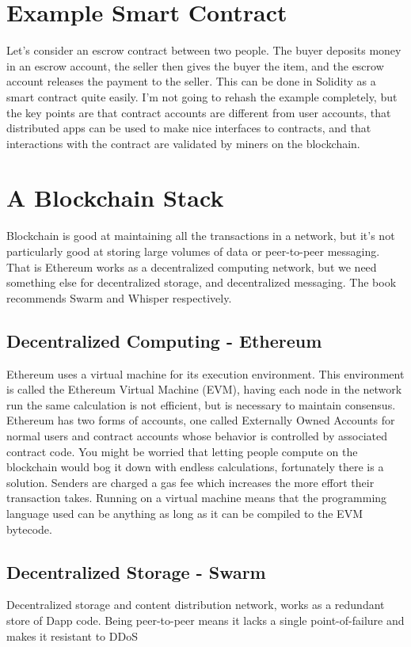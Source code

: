 \documentclass{article}
\begin{document}
\section{Example Smart Contract}

Let's consider an escrow contract between two people. The buyer deposits money in an escrow account, the seller then gives the buyer the item, and the escrow account releases the payment to the seller. This can be done in Solidity as a smart contract quite easily. I'm not going to rehash the example completely, but the key points are that contract accounts are different from user accounts, that distributed apps can be used to make nice interfaces to contracts, and that interactions with the contract are validated by miners on the blockchain.

\section{A Blockchain Stack}

Blockchain is good at maintaining all the transactions in a network, but it's not particularly good at storing large volumes of data or peer-to-peer messaging. That is Ethereum works as a decentralized computing network, but we need something else for decentralized storage, and decentralized messaging. The book recommends Swarm and Whisper respectively.

\subsection{Decentralized Computing - Ethereum}

Ethereum uses a virtual machine for its execution environment. This environment is called the Ethereum Virtual Machine (EVM), having each node in the network run the same calculation is not efficient, but is necessary to maintain consensus. Ethereum has two forms of accounts, one called Externally Owned Accounts for normal users and contract accounts whose behavior is controlled by associated contract code. You might be worried that letting people compute on the blockchain would bog it down with endless calculations, fortunately there is a solution. Senders are charged a gas fee which increases the more effort their transaction takes. Running on a virtual machine means that the programming language used can be anything as long as it can be compiled to the EVM bytecode.

\subsection{Decentralized Storage - Swarm}
Decentralized storage and content distribution network, works as a redundant store of Dapp code. Being peer-to-peer means it lacks a single point-of-failure and makes it resistant to DDoS
\end{document}
